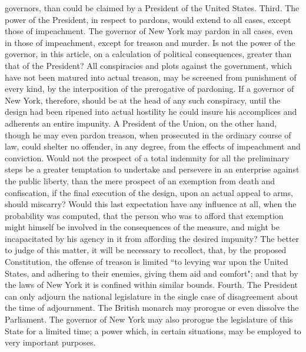 governors, than could be claimed by a President of the United States. Third. The power of the President, in respect to pardons, would extend to all cases, except those of impeachment. The governor of New York may pardon in all cases, even in those of impeachment, except for treason and murder. Is not the power of the governor, in this article, on a calculation of political consequences, greater than that of the President? All conspiracies and plots against the government, which have not been matured into actual treason, may be screened from punishment of every kind, by the interposition of the prerogative of pardoning. If a governor of New York, therefore, should be at the head of any such conspiracy, until the design had been ripened into actual hostility he could insure his accomplices and adherents an entire impunity. A President of the Union, on the other hand, though he may even pardon treason, when prosecuted in the ordinary course of law, could shelter no offender, in any degree, from the effects of impeachment and conviction. Would not the prospect of a total indemnity for all the preliminary steps be a greater temptation to undertake and persevere in an enterprise against the public liberty, than the mere prospect of an exemption from death and confiscation, if the final execution of the design, upon an actual appeal to arms, should miscarry? Would this last expectation have any influence at all, when the probability was computed, that the person who was to afford that exemption might himself be involved in the consequences of the measure, and might be incapacitated by his agency in it from affording the desired impunity? The better to judge of this matter, it will be necessary to recollect, that, by the proposed Constitution, the offense of treason is limited ``to levying war upon the United States, and adhering to their enemies, giving them aid and comfort"; and that by the laws of New York it is confined within similar bounds. Fourth. The President can only adjourn the national legislature in the single case of disagreement about the time of adjournment. The British monarch may prorogue or even dissolve the Parliament. The governor of New York may also prorogue the legislature of this State for a limited time; a power which, in certain situations, may be employed to very important purposes.

